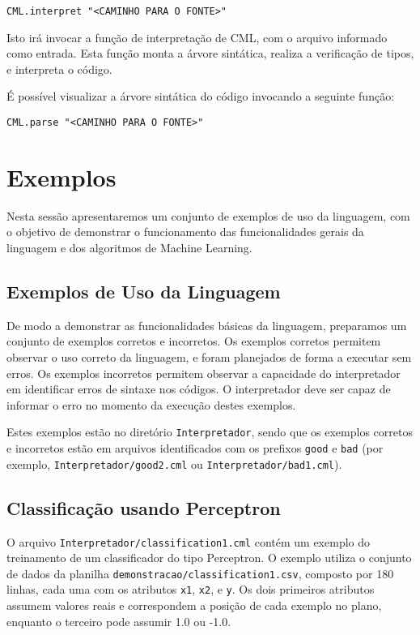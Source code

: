 \documentclass[12pt]{article}
\begin{document}
\begin{verbatim}
CML.interpret "<CAMINHO PARA O FONTE>"
\end{verbatim}

Isto irá invocar a função de interpretação de CML, com o arquivo informado como entrada. Esta função monta a árvore sintática, realiza a verificação de tipos, e interpreta o código.

É possível visualizar a árvore sintática do código invocando a seguinte função:

\begin{verbatim}
CML.parse "<CAMINHO PARA O FONTE>"
\end{verbatim}

\section{Exemplos}

Nesta sessão apresentaremos um conjunto de exemplos de uso da linguagem, com o objetivo de demonstrar o funcionamento das funcionalidades gerais da linguagem e dos algoritmos de Machine Learning.

\subsection{Exemplos de Uso da Linguagem}

De modo a demonstrar as funcionalidades básicas da linguagem, preparamos um conjunto de exemplos corretos e incorretos. Os exemplos corretos permitem observar o uso correto da linguagem, e foram planejados de forma a executar sem erros. Os exemplos incorretos permitem observar a capacidade do interpretador em identificar erros de sintaxe nos códigos. O interpretador deve ser capaz de informar o erro no momento da execução destes exemplos.

Estes exemplos estão no diretório \texttt{Interpretador}, sendo que os exemplos corretos e incorretos estão em arquivos identificados com os prefixos \texttt{good} e \texttt{bad} (por exemplo, \texttt{Interpretador/good2.cml} ou \texttt{Interpretador/bad1.cml}).

\subsection{Classificação usando Perceptron}
O arquivo \texttt{Interpretador/classification1.cml} contém um exemplo do treinamento de um classificador do tipo Perceptron. O exemplo utiliza o conjunto de dados da planilha \texttt{demonstracao/classification1.csv}, composto por 180 linhas, cada uma com os atributos \texttt{x1}, \texttt{x2}, e \texttt{y}. Os dois primeiros atributos assumem valores reais e correspondem a posição de cada exemplo no plano, enquanto o terceiro pode assumir 1.0 ou -1.0.
\end{document}
